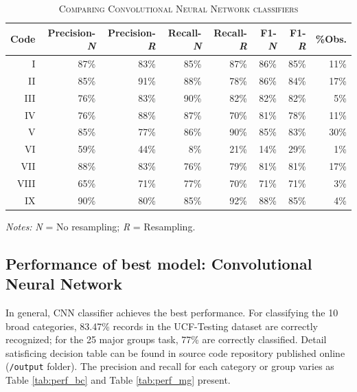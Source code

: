 \documentclass[11pt]{article}
\begin{document}
\begin{table}
\centering
\begin{threeparttable}
    \caption{\textsc{Comparing Convolutional Neural Network classifiers}} \label{tab:perf_compare}
    \begin{tabular}{r|r|r|r|r|r|r|r}
		\hline
			Code & Precision-\textit{N} & Precision-\textit{R} & Recall-\textit{N} & Recall-\textit{R} & F1-\textit{N} & F1-\textit{R} & \%Obs.\\
		\hline
			I & 87\% & 83\% & 85\% & 87\% & 86\% & 85\% & 11\% \\
			II & 85\% & 91\% & 88\% & 78\% & 86\% & 84\% & 17\% \\
			III & 76\% & 83\% & 90\% & 82\% & 82\% & 82\% & 5\% \\
			IV & 76\% & 88\% & 87\% & 70\% & 81\% & 78\% & 11\% \\
			V & 85\% & 77\% & 86\% & 90\% & 85\% & 83\% & 30\% \\
			VI & 59\% & 44\% & 8\% & 21\% & 14\% & 29\% & 1\% \\
			VII & 88\% & 83\% & 76\% & 79\% & 81\% & 81\% & 17\% \\
			VIII & 65\% & 71\% & 77\% & 70\% & 71\% & 71\% & 3\% \\
			IX & 90\% & 80\% & 85\% & 92\% & 88\% & 85\% & 4\% \\
    	 \hline
    \end{tabular}
\begin{tablenotes}
\footnotesize
\item \emph{Notes:} \textit{N} = No resampling; \textit{R} = Resampling.
\end{tablenotes}
\end{threeparttable}
\end{table}



\subsection{Performance of best model: Convolutional Neural Network}

In general, CNN classifier achieves the best performance. For classifying the 10 broad categories, 83.47\% records in the UCF-Testing dataset are correctly recognized; for the 25 major groups task, 77\% are correctly classified. Detail satisficing decision table can be found in source code repository published online (\texttt{/output} folder). The precision and recall for each category or group varies as Table \ref{tab:perf_bc} and Table \ref{tab:perf_mg} present. 
\end{document}
